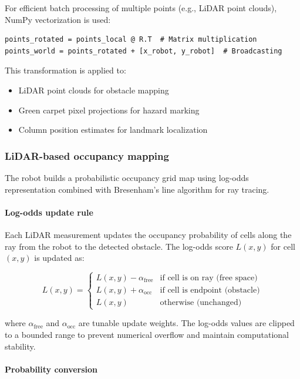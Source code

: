 \documentclass{article}
\begin{document}
For efficient batch processing of multiple points (e.g., LiDAR point clouds), NumPy vectorization is used:

\begin{verbatim}
points_rotated = points_local @ R.T  # Matrix multiplication
points_world = points_rotated + [x_robot, y_robot]  # Broadcasting
\end{verbatim}

This transformation is applied to:
\begin{itemize}
    \item LiDAR point clouds for obstacle mapping
    \item Green carpet pixel projections for hazard marking
    \item Column position estimates for landmark localization
\end{itemize}

\subsubsection{LiDAR-based occupancy mapping}

The robot builds a probabilistic occupancy grid map using log-odds representation combined with Bresenham's line algorithm for ray tracing.

\paragraph{Log-odds update rule}

Each LiDAR measurement updates the occupancy probability of cells along the ray from the robot to the detected obstacle. The log-odds score $L(x,y)$ for cell $(x,y)$ is updated as:

$$
L(x,y) = 
\begin{cases}
L(x,y) - \alpha_{\text{free}} & \text{if cell is on ray (free space)} \\
L(x,y) + \alpha_{\text{occ}} & \text{if cell is endpoint (obstacle)} \\
L(x,y) & \text{otherwise (unchanged)}
\end{cases}
$$

\noindent where $\alpha_{\text{free}}$ and $\alpha_{\text{occ}}$ are tunable update weights. The log-odds values are clipped to a bounded range to prevent numerical overflow and maintain computational stability.

\paragraph{Probability conversion}
\end{document}
